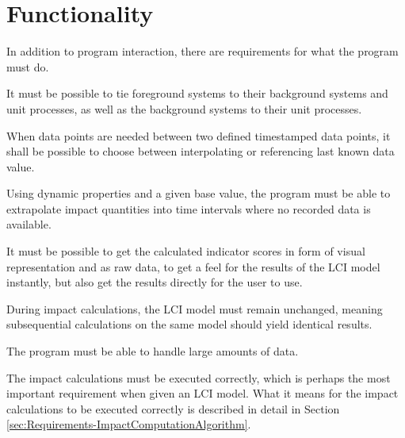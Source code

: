 \section{Functionality} \label{sec:Requirements-Functionality}

In addition to program interaction, there are requirements for what the program must do.

It must be possible to tie foreground systems to their background systems and unit processes, as well as the background systems to their unit processes.

When data points are needed between two defined timestamped data points, it shall be possible to choose between interpolating or referencing last known data value.

Using dynamic properties and a given base value, the program must be able to extrapolate impact quantities into time intervals where no recorded data is available.

It must be possible to get the calculated indicator scores in form of visual representation and as raw data, to get a feel for the results of the LCI model instantly, but also get the results directly for the user to use.

During impact calculations, the LCI model must remain unchanged, meaning subsequential calculations on the same model should yield identical results.

The program must be able to handle large amounts of data. 

The impact calculations must be executed correctly, which is perhaps the most important requirement when given an LCI model. What it means for the impact calculations to be executed correctly is described in detail in Section \ref{sec:Requirements-ImpactComputationAlgorithm}.